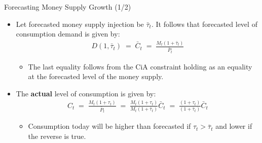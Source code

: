 \documentclass[10pt,c,aspectratio=1610,handout]{beamer}
\begin{document}
\begin{frame}{Forecasting Money Supply Growth (1/2)}%
  \begin{itemize}%
    \item[$\blacktriangleright$] Let forecasted money supply injection be $\bar{\tau}_{t}$. It follows that forecasted level of consumption demand is given by:%
    \begin{align*}%
      D \left( 1, \bar{\tau}_{t} \right) \; = \; \bar{C}_{t} \; = \; \frac{M_{t}(1+\bar{\tau}_{t})}{\bar{P}_{t}}%
    \end{align*}%
    \vspace*{-0.2in}%
    \begin{itemize}%
      \item[$\rightarrow$] The last equality follows from the CiA constraint holding as an equality at the forecasted level of the money supply.%
    \end{itemize}%
    \vspace*{0.2in}%
    \pause%
    \item[$\blacktriangleright$] The \textbf{actual} level of consumption is given by:%
    \begin{align}%
      C_{t} \; = \; \frac{M_{t}(1+\tau_{t})}{\bar{P}_{t}} \; = \; \frac{M_{t}(1+\tau_{t})}{M_{t}(1+\bar{\tau}_{t})} \bar{C}_{t} \; = \; \frac{(1+\tau_{t})}{(1+\bar{\tau}_{t})} \bar{C}_{t}\label{eq:actual_consumption}%
    \end{align}%
    \vspace*{-0.2in}%
    \begin{itemize}%
      \item[$\rightarrow$] Consumption today will be higher than forecasted if $\tau_{t} > \bar{\tau}_{t}$ and lower if the reverse is true.%
    \end{itemize}%
  \end{itemize}%
\end{frame}%
\end{document}
